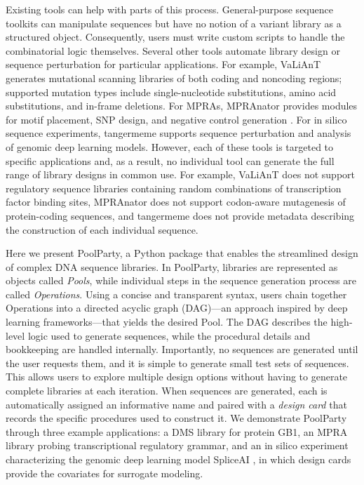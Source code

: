 \documentclass[pdflatex,sn-vancouver-num,referee,oneside]{sn-jnl}
\begin{document}
Existing tools can help with parts of this process. General-purpose sequence toolkits \citep{Cock2009df, Pereira2015wj, Klie2023kg} can manipulate sequences but have no notion of a variant library as a structured object. Consequently, users must write custom scripts to handle the combinatorial logic themselves. Several other tools automate library design or sequence perturbation for particular applications. For example, VaLiAnT \citep{Barbon2022th} generates mutational scanning libraries of both coding and noncoding regions; supported mutation types include single-nucleotide substitutions, amino acid substitutions, and in-frame deletions. For MPRAs, MPRAnator \citep{GeorgakopoulosSoares2017gb} provides modules for motif placement, SNP design, and negative control generation \citep[see also][]{Ghazi2018aa}. For in silico sequence experiments, tangermeme \citep{Schreiber2025nd} supports sequence perturbation and analysis of genomic deep learning models. However, each of these tools is targeted to specific applications and, as a result, no individual tool can generate the full range of library designs in common use. For example, VaLiAnT does not support regulatory sequence libraries containing random combinations of transcription factor binding sites, MPRAnator does not support codon-aware mutagenesis of protein-coding sequences, and tangermeme does not provide metadata describing the construction of each individual sequence.

Here we present PoolParty, a Python package that enables the streamlined design of complex DNA sequence libraries. In PoolParty, libraries are represented as objects called \emph{Pools}, while individual steps in the sequence generation process are called \emph{Operations}. Using a concise and transparent syntax, users chain together Operations into a directed acyclic graph (DAG)---an approach inspired by deep learning frameworks---that yields the desired Pool. The DAG describes the high-level logic used to generate sequences, while the procedural details and bookkeeping are handled internally. Importantly, no sequences are generated until the user requests them, and it is simple to generate small test sets of sequences. This allows users to explore multiple design options without having to generate complete libraries at each iteration. When sequences are generated, each is automatically assigned an informative name and paired with a \emph{design card} that records the specific procedures used to construct it. We demonstrate PoolParty through three example applications: a DMS library for protein GB1, an MPRA library probing transcriptional regulatory grammar, and an in silico experiment characterizing the genomic deep learning model SpliceAI \citep{Jaganathan2019ps}, in which design cards provide the covariates for surrogate modeling.
\end{document}
